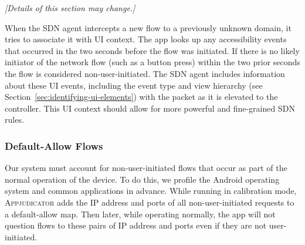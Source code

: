 \textit{[Details of this section may change.]}

When the SDN agent intercepts a new flow to a previously unknown domain, it
tries to associate it with UI context. The app looks up any accessibility events
that occurred in the two seconds before the flow was initiated. If there is no
likely initiator of the network flow (such as a button press) within the two
prior seconds the flow is considered non-user-initiated. The SDN agent includes
information about these UI events, including the event type and view hierarchy
(see Section~\ref{sec:identifying-ui-elements}) with the packet as it is
elevated to the controller. This UI context should allow for more powerful and
fine-grained SDN rules.


\subsubsection{Default-Allow Flows}
\label{sec:default-allow-flows}

Our system must account for non-user-initiated flows that occur as part of the
normal operation of the device. To do this, we profile the Android operating
system and common applications in advance.  While running in calibration mode,
\textsc{Appjudicator} adds the IP address and ports of all non-user-initiated
requests to a default-allow map. Then later, while operating normally, the app
will not question flows to these pairs of IP address and ports even if they are
not user-initiated.



\newpage

